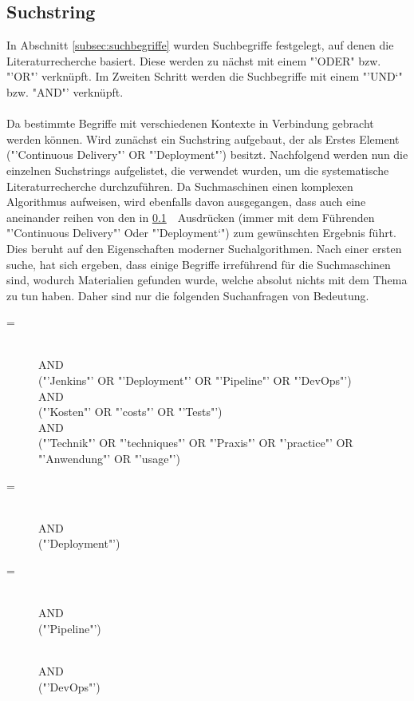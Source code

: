 \subsection{Suchstring}
\label{subsec:suchstring}
In Abschnitt \ref{subsec:suchbegriffe}  wurden Suchbegriffe festgelegt, auf denen die Literaturrecherche basiert. Diese werden zu nächst mit einem "'ODER" bzw. "'OR"' verknüpft. Im Zweiten Schritt werden die Suchbegriffe mit einem "'UND`" bzw. "AND"' verknüpft.
\\\\
Da bestimmte Begriffe mit verschiedenen Kontexte in Verbindung gebracht werden können. Wird zunächst ein Suchstring aufgebaut, der als Erstes Element ("'Continuous Delivery"' OR "'Deployment"') besitzt. Nachfolgend werden nun die einzelnen Suchstrings aufgelistet, die verwendet wurden, um die systematische Literaturrecherche durchzuführen. Da Suchmaschinen einen komplexen Algorithmus aufweisen, wird ebenfalls davon ausgegangen, dass auch eine aneinander reihen von den in \ref{subsec:suchstring}\ \ Ausdrücken (immer mit dem Führenden "'Continuous Delivery"' Oder "'Deployment`") zum gewünschten Ergebnis führt. Dies beruht auf den Eigenschaften moderner Suchalgorithmen.
Nach einer ersten suche, hat sich ergeben, dass einige Begriffe irreführend für die Suchmaschinen sind, wodurch Materialien gefunden wurde, welche absolut nichts mit dem Thema zu tun haben. Daher sind nur die folgenden Suchanfragen von Bedeutung.

\begin{description}
	\item[ =] \suchstringPrefix \\AND\\ ("'Jenkins"' OR "'Deployment"' OR "'Pipeline"' OR "'DevOps"') \\AND\\ ("'Kosten"' OR "'costs"' OR "'Tests"') \\AND\\ ("'Technik"' OR "'techniques"' OR "'Praxis"' OR "'practice"' OR "'Anwendung"' OR "'usage"')
    
    \item[ =] \suchstringPrefix \\AND\\ ("'Deployment"')
    
    \item[ =] \suchstringPrefix \\AND\\ ("'Pipeline"')
    
    \item[] \suchstringPrefix \\AND\\ ("'DevOps"')
\end{description}\noindent

